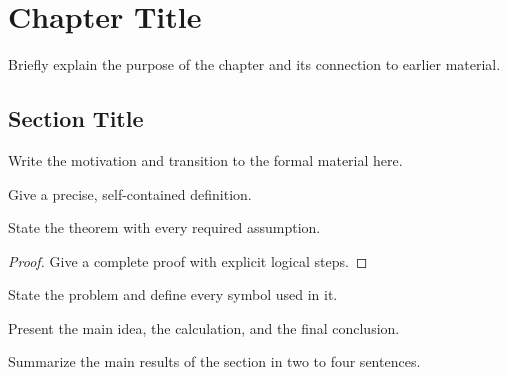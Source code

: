 \chapter{Chapter Title}
\label{ch:short-name}

Briefly explain the purpose of the chapter and its connection to earlier
material.

\section{Section Title}

Write the motivation and transition to the formal material here.

\begin{definition}
  \label{def:short-name}
  Give a precise, self-contained definition.
\end{definition}

\begin{theorem}
  \label{thm:short-name}
  State the theorem with every required assumption.
\end{theorem}

\begin{proof}
  Give a complete proof with explicit logical steps.
\end{proof}

\begin{problem}
  \label{prob:short-name}
  State the problem and define every symbol used in it.
\end{problem}

\begin{solution}
  Present the main idea, the calculation, and the final conclusion.
\end{solution}

\begin{summary}
  Summarize the main results of the section in two to four sentences.
\end{summary}
